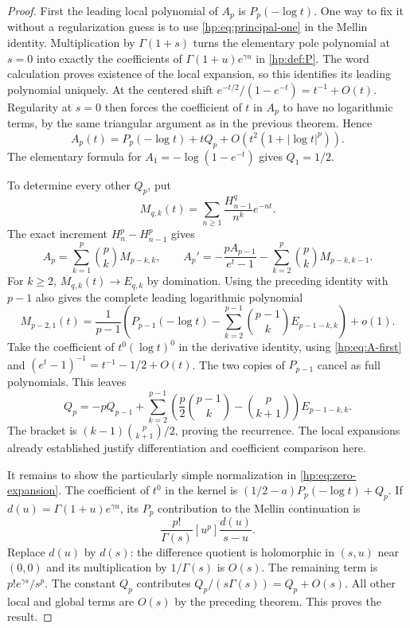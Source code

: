 \documentclass[11pt,a4paper]{article}
\numberwithin{equation}{section}
\theoremstyle{definition}
\theoremstyle{remark}
\begin{document}
\begin{proof}
First the leading local polynomial of $A_p$ is $P_p(-\log t)$.
One way to fix it without a regularization guess is to use
\eqref{hp:eq:principal-one} in the Mellin identity. Multiplication by
$\Gamma(1+s)$ turns the elementary pole polynomial at $s=0$ into
exactly the coefficients of
$\Gamma(1+u)e^{\gamma u}$ in \eqref{hp:def:P}.
The word calculation proves existence of the local expansion, so this
identifies its leading polynomial uniquely.
At the centered shift
$e^{-t/2}/(1-e^{-t})=t^{-1}+O(t)$.
Regularity at $s=0$ then forces the coefficient of $t$ in $A_p$ to
have no logarithmic terms, by the same triangular argument as in the
previous theorem. Hence
\begin{equation}\label{hp:eq:A-first}
 A_p(t)=P_p(-\log t)+tQ_p+O(t^2(1+|\log t|^p)).
\end{equation}
The elementary formula for $A_1=-\log(1-e^{-t})$ gives $Q_1=1/2$.

To determine every other $Q_p$, put
\[
 M_{q,k}(t)=\sum_{n\ge1}\frac{H_{n-1}^q}{n^k}e^{-nt}.
\]
The exact increment $H_n^p-H_{n-1}^p$ gives
\[
 A_p=\sum_{k=1}^p\binom pkM_{p-k,k},\qquad
 A_p'=-\frac{pA_{p-1}}{e^t-1}
            -\sum_{k=2}^p\binom pkM_{p-k,k-1}.
\]
For $k\ge2$, $M_{q,k}(t)\to E_{q,k}$ by domination.
Using the preceding identity with $p-1$ also gives the complete
leading logarithmic polynomial
\[
 M_{p-2,1}(t)=\frac{1}{p-1}
 \left(P_{p-1}(-\log t)-
       \sum_{k=2}^{p-1}\binom{p-1}kE_{p-1-k,k}\right)+o(1).
\]
Take the coefficient of $t^0(\log t)^0$ in the derivative identity,
using \eqref{hp:eq:A-first} and
$(e^t-1)^{-1}=t^{-1}-1/2+O(t)$.
The two copies of $P_{p-1}$ cancel as full polynomials. This leaves
\[
 Q_p=-pQ_{p-1}+\sum_{k=2}^{p-1}
 \left(\frac p2\binom{p-1}k-\binom p{k+1}\right)E_{p-1-k,k}.
\]
The bracket is $(k-1)\binom p{k+1}/2$, proving the recurrence.
The local expansions already established justify differentiation and
coefficient comparison here.

It remains to show the particularly simple normalization in
\eqref{hp:eq:zero-expansion}. The coefficient of $t^0$ in the kernel is
$(1/2-a)P_p(-\log t)+Q_p$. If
$d(u)=\Gamma(1+u)e^{\gamma u}$, its $P_p$ contribution to the Mellin
continuation is
\[
 \frac{p!}{\Gamma(s)}[u^p]\frac{d(u)}{s-u}.
\]
Replace $d(u)$ by $d(s)$: the difference quotient is holomorphic in
$(s,u)$ near $(0,0)$ and its multiplication by $1/\Gamma(s)$ is
$O(s)$. The remaining term is
$p!e^{\gamma s}/s^p$. The constant $Q_p$ contributes
$Q_p/(s\Gamma(s))=Q_p+O(s)$. All other local and global terms are
$O(s)$ by the preceding theorem. This proves the result.
\end{proof}
\end{document}

